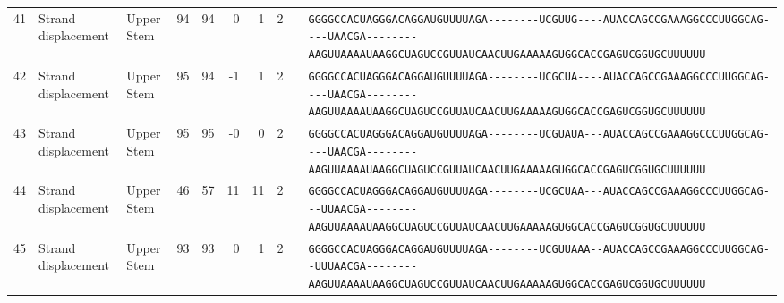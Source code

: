 \begin{tabular}{rllrrrrrcl}
 41 & Strand displacement & Upper Stem & 94 & 94 & 0 & 1 & 2 &  &
 \color{ucsfdarkgrey}\verb|GGGGCCACUAGGGACAGGAU|\color{ucsforange}\verb|GUUUUA|\color{ucsfblue}\verb|GA--------UCGUUG----|\color{ucsfpurple}\verb|AUACCAGCCGAAAGGCCCUUGGCAG|\color{ucsfblue}\verb|----UAACGA--------AAGU|\color{ucsforange}\verb|UAAAAUAA|\color{ucsfnavy}\verb|GGCUAGUCC|\color{ucsforange}\verb|GUUAUCA|\color{ucsfteal}\verb|ACUUGAAAAAGU|\color{ucsforange}\verb|GGCACCGAGUCGGUGCUUUUUU| \\

 42 & Strand displacement & Upper Stem & 95 & 94 & -1 & 1 & 2 &  &
 \color{ucsfdarkgrey}\verb|GGGGCCACUAGGGACAGGAU|\color{ucsforange}\verb|GUUUUA|\color{ucsfblue}\verb|GA--------UCGCUA----|\color{ucsfpurple}\verb|AUACCAGCCGAAAGGCCCUUGGCAG|\color{ucsfblue}\verb|----UAACGA--------AAGU|\color{ucsforange}\verb|UAAAAUAA|\color{ucsfnavy}\verb|GGCUAGUCC|\color{ucsforange}\verb|GUUAUCA|\color{ucsfteal}\verb|ACUUGAAAAAGU|\color{ucsforange}\verb|GGCACCGAGUCGGUGCUUUUUU| \\

 43 & Strand displacement & Upper Stem & 95 & 95 & -0 & 0 & 2 &  &
 \color{ucsfdarkgrey}\verb|GGGGCCACUAGGGACAGGAU|\color{ucsforange}\verb|GUUUUA|\color{ucsfblue}\verb|GA--------UCGUAUA---|\color{ucsfpurple}\verb|AUACCAGCCGAAAGGCCCUUGGCAG|\color{ucsfblue}\verb|----UAACGA--------AAGU|\color{ucsforange}\verb|UAAAAUAA|\color{ucsfnavy}\verb|GGCUAGUCC|\color{ucsforange}\verb|GUUAUCA|\color{ucsfteal}\verb|ACUUGAAAAAGU|\color{ucsforange}\verb|GGCACCGAGUCGGUGCUUUUUU| \\

 44 & Strand displacement & Upper Stem & 46 & 57 & 11 & 11 & 2 &  &
 \color{ucsfdarkgrey}\verb|GGGGCCACUAGGGACAGGAU|\color{ucsforange}\verb|GUUUUA|\color{ucsfblue}\verb|GA--------UCGCUAA---|\color{ucsfpurple}\verb|AUACCAGCCGAAAGGCCCUUGGCAG|\color{ucsfblue}\verb|---UUAACGA--------AAGU|\color{ucsforange}\verb|UAAAAUAA|\color{ucsfnavy}\verb|GGCUAGUCC|\color{ucsforange}\verb|GUUAUCA|\color{ucsfteal}\verb|ACUUGAAAAAGU|\color{ucsforange}\verb|GGCACCGAGUCGGUGCUUUUUU| \\

 45 & Strand displacement & Upper Stem & 93 & 93 & 0 & 1 & 2 &  &
 \color{ucsfdarkgrey}\verb|GGGGCCACUAGGGACAGGAU|\color{ucsforange}\verb|GUUUUA|\color{ucsfblue}\verb|GA--------UCGUUAAA--|\color{ucsfpurple}\verb|AUACCAGCCGAAAGGCCCUUGGCAG|\color{ucsfblue}\verb|--UUUAACGA--------AAGU|\color{ucsforange}\verb|UAAAAUAA|\color{ucsfnavy}\verb|GGCUAGUCC|\color{ucsforange}\verb|GUUAUCA|\color{ucsfteal}\verb|ACUUGAAAAAGU|\color{ucsforange}\verb|GGCACCGAGUCGGUGCUUUUUU| \\


\end{tabular}
